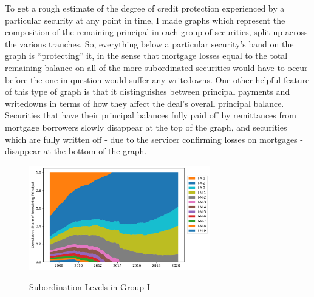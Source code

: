 \documentclass[12pt]{article}
\begin{document}
To get a rough estimate of the degree of credit protection experienced by a particular security at any point in time, I made graphs which represent the composition of the remaining principal in each group of securities, split up across the various tranches. So, everything below a particular security’s band on the graph is “protecting” it, in the sense that mortgage losses equal to the total remaining balance on all of the more subordinated securities would have to occur before the one in question would suffer any writedowns. One other helpful feature of this type of graph is that it distinguishes between principal payments and writedowns in terms of how they affect the deal’s overall principal balance. Securities that have their principal balances fully paid off by remittances from mortgage borrowers slowly disappear at the top of the graph, and securities which are fully written off - due to the servicer confirming losses on mortgages - disappear at the bottom of the graph.


\begin{figure}[h]
	\centering
	\caption{Subordination Levels in Group I}
	\includegraphics[width=0.7\textwidth]{../figures/stackplot_share_of_principal_group_i}
	\label{fig:stackplot_share_of_principal_group_i}
\end{figure}
\end{document}

